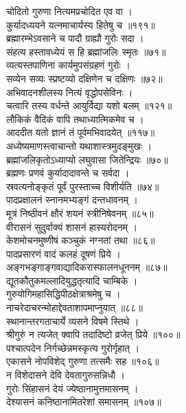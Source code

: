 चोदितो गुरुणा नित्यमप्रचोदित एव वा ।\\[-2mm]
कुर्यादध्ययने यत्नमाचार्यस्य हितेषु च ॥१९१॥\\
ब्रह्मारम्भेऽवसाने च पादौ ग्राह्यौ गुरोः सदा ।\\[-2mm]
संहत्य हस्तावध्येयं स हि ब्रह्मांजलिः स्मृतः ॥७१॥\\
व्यत्यस्तपाणिना कार्यमुपसंग्रहणं गुरोः ।\\[-2mm]
 सव्येन सव्यः स्प्रष्टव्यो दक्षिणेन च दक्षिणः ॥७२॥\\
अभिवादनशीलस्य नित्यं वृद्धोपसेविनः ।\\[-2mm]
चत्वारि तस्य वर्धन्ते आयुर्विद्या यशो बलम् ॥१२१॥\\
लौकिकं वैदिकं वापि तथाध्यात्मिकमेव च ।\\[-2mm]
आददीत यतो ज्ञानं तं पूर्वमभिवादयेत् ॥११७॥\\
अध्येष्यमाणस्त्वाचान्तो यथाशास्त्रमुदङ्मुखः ।\\[-2mm]
ब्रह्मांजलिकृतोऽध्याप्यो लघुवासा जितेन्द्रियः ॥७०॥\\
ब्रह्मणः प्रणवं कुर्यादादावन्ते च सर्वदा ।\\[-2mm]
स्रवत्यनोङ्कृतं पूर्वं पुरस्ताच्च विशीर्यति ॥७४॥\\
पादप्रक्षालनं स्नानमभ्यङ्गं दन्तधावनम् ।\\[-2mm]
मूत्रं निष्ठीवनं क्षौरं शयनं स्त्रीनिषेवनम् ॥८५॥\\
वीरासनं सुदुर्वाक्यं शासनं हास्यरोदनम् ।\\[-2mm]
केशमोचनमुष्णीषं कञ्चुकं नग्नतां तथा ॥८६॥\\
पादप्रसारणं वादं कलहं दूषणं प्रिये ।\\[-2mm]
अङ्गभङ्गाङ्गवाद्यादिकरास्फालनधूननम् ॥८७॥\\
द्यूतकौतुकमल्लादियुद्धतृत्यादि चाम्बिके ।\\[-2mm]
गुरुयोगिमहासिद्धिपीठक्षेत्राश्रमेषु च ।\\[-2mm]
नाचरेदाचरन्मोहाद्देवताशापमाप्नुयात् ॥८८॥\\
स्थानान्तरगताचार्ये व्यसने विषमे स्तिथे ।\\[-2mm]
श्रीगुरुं न त्यजेत् क्वापि तदादिष्टो व्रजेत् प्रिये ॥१००॥\\
पश्चात्पदेन निर्गच्छेन्नमस्कृत्य गुरोर्गृहात् ।\\[-2mm]
एकासने नोपविशेद् गुरुणा तत्समैः सह ॥१०६॥\\
न विशेदासने देवि देवतागुरुसन्निधौ ।\\[-2mm]
गुरोः सिंहासनं देयं ज्येष्ठानामुत्तमासनम् ।\\[-2mm]
देश्यासनं कनिष्ठानामितरेशां समासनम् ॥१०७॥\\

